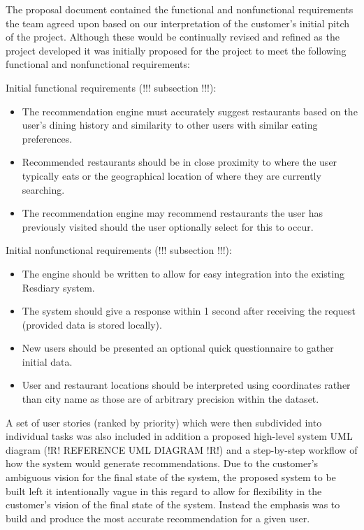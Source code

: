 \documentclass{l3proj}
\begin{document}
The proposal document contained the functional and nonfunctional requirements the team agreed upon based on our interpretation of the customer’s initial pitch of the project. Although these would be continually revised and refined as the project developed it was initially proposed for the project to meet the following functional and nonfunctional requirements:

Initial functional requirements (!!! subsection !!!):
\begin{itemize}
\item The recommendation engine must accurately suggest restaurants based on the user’s dining history and similarity to other users with similar eating preferences.
\item Recommended restaurants should be in close proximity to where the user typically eats or the geographical location of where they are currently searching.
\item The recommendation engine may recommend restaurants the user has previously visited should the user optionally select for this to occur.
\end{itemize}

Initial nonfunctional requirements (!!! subsection !!!):
\begin{itemize}
\item The engine should be written to allow for easy integration into the existing Resdiary system.
\item The system should give a response within 1 second after receiving the request (provided data is stored locally).
\item New users should be presented an optional quick questionnaire to gather initial data.
\item User and restaurant locations should be interpreted using coordinates rather than city  name as those are of arbitrary precision within the dataset.
\end{itemize}

A set of user stories (ranked by priority) which were then subdivided into individual tasks was also included in addition a proposed high-level system UML diagram (!R! REFERENCE UML DIAGRAM !R!) and a step-by-step workflow of how the system would generate recommendations. Due to the customer’s ambiguous vision for the final state of the system, the proposed system to be built left it intentionally vague in this regard to allow for flexibility in the customer’s vision of the final state of the system. Instead the emphasis was to build and produce the most accurate recommendation for a given user.
\end{document}

